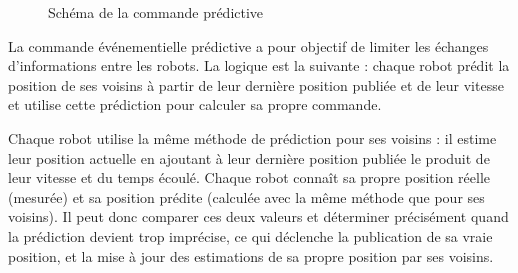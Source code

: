 \begin{figure}
    \caption[Schéma de la commande prédictive]{Schéma de la commande prédictive}
    \label{fig:cmd_pred_tikz}
    \vspace{-10pt} %
\end{figure}
La commande événementielle prédictive a pour objectif de limiter les échanges d'informations entre les robots. La logique est la suivante : chaque robot prédit la position de ses voisins à partir de leur dernière position publiée et de leur vitesse et utilise cette prédiction pour calculer sa propre commande. 

Chaque robot utilise la même méthode de prédiction pour ses voisins : il estime leur position actuelle en ajoutant à leur dernière position publiée le produit de leur vitesse et du temps écoulé. Chaque robot connaît sa propre position réelle (mesurée) et sa position prédite (calculée avec la même méthode que pour ses voisins). Il peut donc comparer ces deux valeurs et déterminer précisément quand la prédiction devient trop imprécise, ce qui déclenche la publication de sa vraie position, et la mise à jour des estimations de sa propre position par ses voisins.
  
